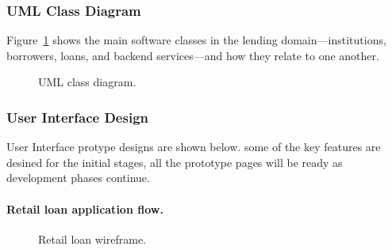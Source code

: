 \caption[Loan approval sequence]{Loan approval sequence.}
\label{fig:seq-loan-flow}
\label{fig:seq-loan}\label{fig:seq-reject}
\SequenceDiagramEnd

\caption[Installment and income verification]{Installment and income verification.}
\label{fig:seq-installment-income}
\label{fig:seq-installment}\label{fig:seq-income}
\SequenceDiagramEnd

\caption[Hierarchical banking and data sync]{Hierarchical banking and data sync.}
\label{fig:seq-banking-data}
\label{fig:seq-hierarchy}\label{fig:seq-marketdata}\label{fig:seq-borrowlimit}
\SequenceDiagramEnd

\caption[Chat and AI agent sequences]{Chat and AI agent sequences.}
\label{fig:seq-chat-bot}
\label{fig:seq-chat}\label{fig:seq-aichatbot}
\SequenceDiagramEnd

\subsubsection{UML Class Diagram}
\label{sec:uml-class-diagram}

Figure~\ref{fig:uml-class} shows the main software classes in the lending domain---institutions, borrowers, loans, and backend services---and how they relate to one another.

\begin{figure}[H]
\centering
{}
\caption[UML class diagram]{UML class diagram.}
\label{fig:uml-class}
\end{figure}

\subsubsection{User Interface Design}
\label{sec:ui-design}

User Interface protype designs are shown below. some of the key features are desined for the initial stages, all the prototype pages will be ready as development phases continue.

\paragraph{Retail loan application flow.}
\begin{figure}[H]
\centering
{}
\caption[Retail loan wireframe]{Retail loan wireframe.}
\label{fig:ui-wireframe-retail}
\end{figure}

